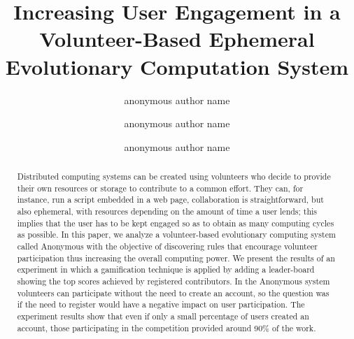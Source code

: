 \documentclass{llncs}
\begin{document}
\sloppy

\title{Increasing User Engagement in a Volunteer-Based Ephemeral Evolutionary Computation System}


\author{anonymous author name  \and anonymous author name \and  anonymous author name }







\maketitle


\begin{abstract}

Distributed computing systems can be created using volunteers who decide to
provide their own  resources or storage to contribute to a common effort. They can, for instance, run a script embedded in a web page, collaboration is straightforward, but also ephemeral, with resources depending on the amount of time a user lends; this  implies that
the user has to be kept engaged so as to obtain as many computing cycles as
possible. In this paper, we analyze a volunteer-based evolutionary computing system called
Anonymous with the objective of discovering rules that encourage volunteer
participation thus increasing the overall computing power. We present the results of
an experiment in which a gamification technique is applied by adding a leader-board
showing the top scores achieved by registered contributors. In the
Anonymous system volunteers can
participate without the need to create an account, so the question was
if the need to register would have a negative impact on user participation.
The experiment results show that even if only a small percentage of users created an account,
those participating in the competition provided around 90\% of the work.

\end{abstract}
\end{document}
